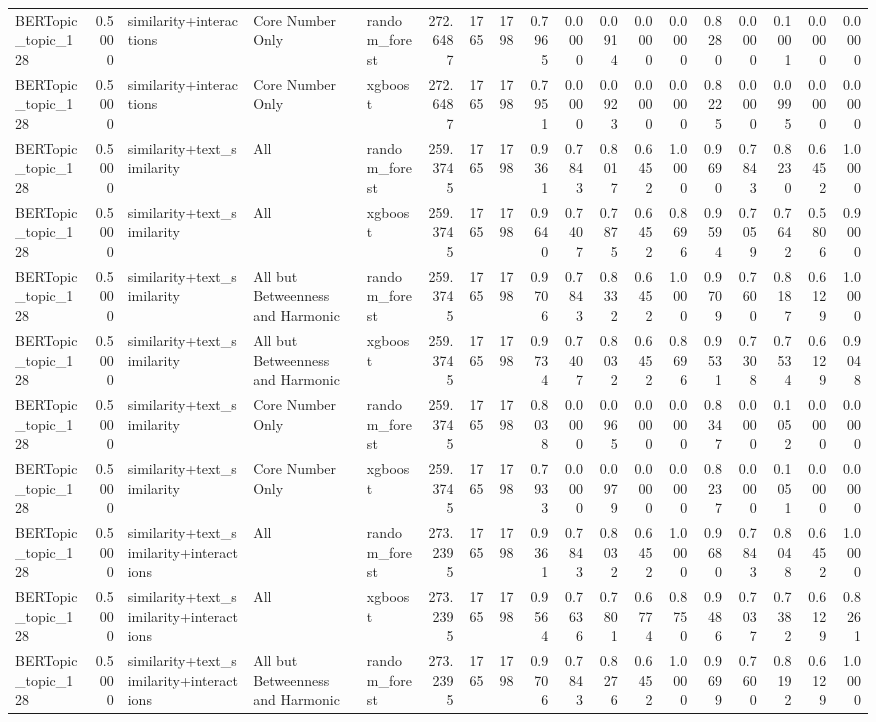 \begin{tabular}{lrlllrrrrrrrrrrrrr}
BERTopic_topic_128 & 0.5000 & similarity+interactions & Core Number Only & random_forest & 272.6487 & 1765 & 1798 & 0.7965 & 0.0000 & 0.0914 & 0.0000 & 0.0000 & 0.8280 & 0.0000 & 0.1001 & 0.0000 & 0.0000 \\
BERTopic_topic_128 & 0.5000 & similarity+interactions & Core Number Only & xgboost & 272.6487 & 1765 & 1798 & 0.7951 & 0.0000 & 0.0923 & 0.0000 & 0.0000 & 0.8225 & 0.0000 & 0.0995 & 0.0000 & 0.0000 \\
BERTopic_topic_128 & 0.5000 & similarity+text_similarity & All & random_forest & 259.3745 & 1765 & 1798 & 0.9361 & 0.7843 & 0.8017 & 0.6452 & 1.0000 & 0.9690 & 0.7843 & 0.8230 & 0.6452 & 1.0000 \\
BERTopic_topic_128 & 0.5000 & similarity+text_similarity & All & xgboost & 259.3745 & 1765 & 1798 & 0.9640 & 0.7407 & 0.7875 & 0.6452 & 0.8696 & 0.9594 & 0.7059 & 0.7642 & 0.5806 & 0.9000 \\
BERTopic_topic_128 & 0.5000 & similarity+text_similarity & All but Betweenness and Harmonic & random_forest & 259.3745 & 1765 & 1798 & 0.9706 & 0.7843 & 0.8332 & 0.6452 & 1.0000 & 0.9709 & 0.7600 & 0.8187 & 0.6129 & 1.0000 \\
BERTopic_topic_128 & 0.5000 & similarity+text_similarity & All but Betweenness and Harmonic & xgboost & 259.3745 & 1765 & 1798 & 0.9734 & 0.7407 & 0.8032 & 0.6452 & 0.8696 & 0.9531 & 0.7308 & 0.7534 & 0.6129 & 0.9048 \\
BERTopic_topic_128 & 0.5000 & similarity+text_similarity & Core Number Only & random_forest & 259.3745 & 1765 & 1798 & 0.8038 & 0.0000 & 0.0965 & 0.0000 & 0.0000 & 0.8347 & 0.0000 & 0.1052 & 0.0000 & 0.0000 \\
BERTopic_topic_128 & 0.5000 & similarity+text_similarity & Core Number Only & xgboost & 259.3745 & 1765 & 1798 & 0.7933 & 0.0000 & 0.0979 & 0.0000 & 0.0000 & 0.8237 & 0.0000 & 0.1051 & 0.0000 & 0.0000 \\
BERTopic_topic_128 & 0.5000 & similarity+text_similarity+interactions & All & random_forest & 273.2395 & 1765 & 1798 & 0.9361 & 0.7843 & 0.8032 & 0.6452 & 1.0000 & 0.9680 & 0.7843 & 0.8048 & 0.6452 & 1.0000 \\
BERTopic_topic_128 & 0.5000 & similarity+text_similarity+interactions & All & xgboost & 273.2395 & 1765 & 1798 & 0.9564 & 0.7636 & 0.7801 & 0.6774 & 0.8750 & 0.9486 & 0.7037 & 0.7382 & 0.6129 & 0.8261 \\
BERTopic_topic_128 & 0.5000 & similarity+text_similarity+interactions & All but Betweenness and Harmonic & random_forest & 273.2395 & 1765 & 1798 & 0.9706 & 0.7843 & 0.8276 & 0.6452 & 1.0000 & 0.9699 & 0.7600 & 0.8192 & 0.6129 & 1.0000 \\

\end{tabular}
